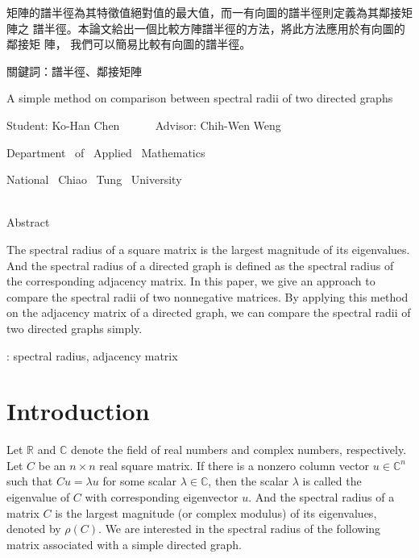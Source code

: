 \documentclass[12pt, a4paper]{article}
\theoremstyle{plain}
\theoremstyle{definition}
\begin{document}
 矩陣的譜半徑為其特徵值絕對值的最大值，而一有向圖的譜半徑則定義為其鄰接矩陣之
 譜半徑。本論文給出一個比較方陣譜半徑的方法，將此方法應用於有向圖的鄰接矩
 陣， 我們可以簡易比較有向圖的譜半徑。
 \\
\bigskip

\noindent 關鍵詞：譜半徑、鄰接矩陣
\pagebreak



\begin{center}{\LARGE
A simple method on comparison between spectral radii of two directed graphs
\bigskip\bigskip\bigskip}

{ \large
Student: Ko-Han Chen  ~~~~~ Advisor: Chih-Wen Weng \\
\Large

Department ~of~ Applied ~Mathematics
\bigskip

National~ Chiao ~Tung~ University
\bigskip\bigskip\bigskip\bigskip}\\
{\large Abstract}
\end{center}

The spectral radius of a square matrix is the largest magnitude of its eigenvalues. And the
 spectral radius of a directed graph is defined as the spectral radius of the corresponding
 adjacency matrix. In this paper, we give an approach to compare the spectral radii of two
 nonnegative matrices. By applying this method on the adjacency matrix of a
 directed graph, we can compare the spectral radii of two directed graphs simply.

\bigskip


: spectral radius, adjacency matrix
\pagebreak


\renewcommand{\baselinestretch}{1.2}
\large
\tableofcontents


\clearpage
{}
\linespread{1.5}

\setcounter{page}{1}
\section{Introduction}

Let $\mathbb{R}$ and $\mathbb{C}$ denote the
 field of real numbers and complex numbers, respectively.
 Let $C$ be an $n\times n$ real square matrix. If there is
 a nonzero column vector $u\in\mathbb{C}^n$ such that
 $Cu=\lambda u$ for some scalar $\lambda\in\mathbb{C}$,
 then the scalar $\lambda$ is called the eigenvalue of
 $C$ with corresponding eigenvector $u$. And the spectral
 radius of a matrix $C$ is the largest magnitude (or complex
 modulus) of its eigenvalues, denoted by $\rho(C)$. We are
 interested in the spectral radius of the following matrix
associated with a simple directed graph.
\end{document}
